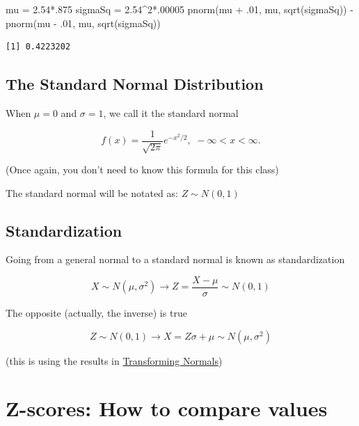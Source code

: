 \documentclass[
  letterpaper,
  DIV=11,
  numbers=noendperiod]{scrartcl}
\newenvironment{Shaded}{\begin{snugshade}}{\end{snugshade}}
\newcommand{\DecValTok}[1]{\textcolor[rgb]{0.68,0.00,0.00}{#1}}
\newcommand{\FloatTok}[1]{\textcolor[rgb]{0.68,0.00,0.00}{#1}}
\newcommand{\FunctionTok}[1]{\textcolor[rgb]{0.28,0.35,0.67}{#1}}
\newcommand{\NormalTok}[1]{\textcolor[rgb]{0.00,0.23,0.31}{#1}}
\newcommand{\OtherTok}[1]{\textcolor[rgb]{0.00,0.23,0.31}{#1}}
\newcommand{\SpecialCharTok}[1]{\textcolor[rgb]{0.37,0.37,0.37}{#1}}
\begin{document}
\begin{Shaded}
\begin{Highlighting}[]
\NormalTok{mu      }\OtherTok{=} \FloatTok{2.54}\SpecialCharTok{*}\NormalTok{.}\DecValTok{875}
\NormalTok{sigmaSq }\OtherTok{=} \FloatTok{2.54}\SpecialCharTok{\^{}}\DecValTok{2}\SpecialCharTok{*}\NormalTok{.}\DecValTok{00005}
\FunctionTok{pnorm}\NormalTok{(mu }\SpecialCharTok{+}\NormalTok{ .}\DecValTok{01}\NormalTok{, mu, }\FunctionTok{sqrt}\NormalTok{(sigmaSq)) }\SpecialCharTok{{-}} 
    \FunctionTok{pnorm}\NormalTok{(mu }\SpecialCharTok{{-}}\NormalTok{ .}\DecValTok{01}\NormalTok{, mu, }\FunctionTok{sqrt}\NormalTok{(sigmaSq))}
\end{Highlighting}
\end{Shaded}

\begin{verbatim}
[1] 0.4223202
\end{verbatim}

\subsection{The Standard Normal
Distribution}\label{the-standard-normal-distribution}

When \(\mu=0\) and \(\sigma=1\), we call it the {standard normal}

\[
f(x)=\frac1{\sqrt{2\pi}}e^{-x^2/2},\,\,-\infty<x<\infty.
\]

{(Once again, you don't need to know this formula for this class)}

The standard normal will be notated as: \(Z \sim N(0,1)\)

\subsection{Standardization}\label{standardization}

Going from a general normal to a standard normal is known as
{standardization}

\[
X \sim N(\mu, \sigma^2) \longrightarrow Z = \frac{X - \mu}{\sigma} \sim N(0,1)
\]

The opposite (actually, the {inverse}) is true

\[
Z \sim N(0, 1) \longrightarrow X = Z \sigma + \mu \sim N(\mu,\sigma^2)
\]

{(this is using the results in
\hyperref[transformingNormals]{Transforming Normals})}

\section{Z-scores: How to compare
values}\label{z-scores-how-to-compare-values}
\end{document}
